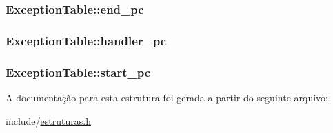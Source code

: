 \subsubsection[{\texorpdfstring{end\+\_\+pc}{end_pc}}]{ Exception\+Table\+::end\+\_\+pc}\hypertarget{struct_exception_table_ac2df73606ebe48af50a629f83fe9c677}{}\label{struct_exception_table_ac2df73606ebe48af50a629f83fe9c677}
\subsubsection[{\texorpdfstring{handler\+\_\+pc}{handler_pc}}]{ Exception\+Table\+::handler\+\_\+pc}\hypertarget{struct_exception_table_a664ec4b395e02d3a5bfa6cef3493c1e7}{}\label{struct_exception_table_a664ec4b395e02d3a5bfa6cef3493c1e7}
\subsubsection[{\texorpdfstring{start\+\_\+pc}{start_pc}}]{ Exception\+Table\+::start\+\_\+pc}\hypertarget{struct_exception_table_af137b3a966825f91146039797d3b1ba5}{}\label{struct_exception_table_af137b3a966825f91146039797d3b1ba5}


A documentação para esta estrutura foi gerada a partir do seguinte arquivo\+:\begin{DoxyCompactItemize}
\item 
include/\hyperlink{estruturas_8h}{estruturas.\+h}\end{DoxyCompactItemize}
